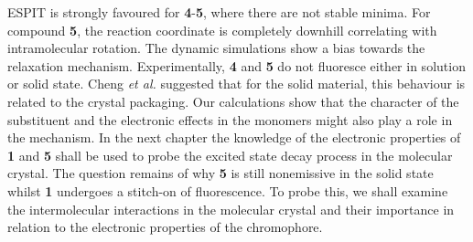 ESPIT is strongly favoured for \textbf{4}-\textbf{5}, where there are not stable \Estar{} minima. For compound \textbf{5}, the reaction coordinate is completely downhill correlating with intramolecular rotation. The dynamic simulations show a bias towards the \Kstar{} relaxation mechanism. Experimentally, \textbf{4} and \textbf{5} do not fluoresce either in solution or solid state. Cheng \textit{et al.} suggested that for the solid material, this behaviour is related to the crystal packaging.\cite{Cheng2015} Our calculations show that the character of the substituent and the electronic effects in the monomers might also play a role in the mechanism. In the next chapter the knowledge of the electronic properties of \textbf{1} and \textbf{5} shall be used to probe the excited state decay process in the molecular crystal. The question remains of why \textbf{5} is still nonemissive in the solid state whilst \textbf{1} undergoes a stitch-on of fluorescence. To probe this, we shall examine the intermolecular interactions in the molecular crystal and their importance in relation to the electronic properties of the chromophore. 



